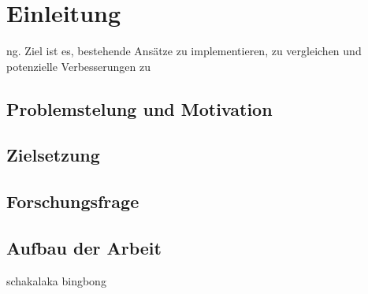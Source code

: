 \chapter{Einleitung}\label{ch:einleitung}
ng. Ziel ist es, bestehende Ansätze zu implementieren, zu vergleichen und potenzielle Verbesserungen
zu

\section{Problemstelung und Motivation}

\section{Zielsetzung}

\section{Forschungsfrage}

\section{Aufbau der Arbeit}

schakalaka bingbong